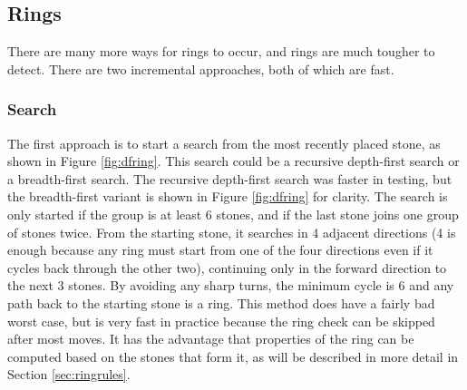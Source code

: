 \subsection{Rings}\label{sec:ringimpl}

There are many more ways for rings to occur, and rings are much tougher to detect. There are two incremental approaches, both of which are fast.

\subsubsection{Search}

The first approach is to start a search from the most recently placed stone, as shown in Figure \ref{fig:dfring}. This search could be a recursive depth-first search or a breadth-first search. The recursive depth-first search was faster in testing, but the breadth-first variant is shown in Figure \ref{fig:dfring} for clarity. The search is only started if the group is at least 6 stones, and if the last stone joins one group of stones twice. From the starting stone, it searches in 4 adjacent directions (4 is enough because any ring must start from one of the four directions even if it cycles back through the other two), continuing only in the forward direction to the next 3 stones. By avoiding any sharp turns, the minimum cycle is 6 and any path back to the starting stone is a ring. This method does have a fairly bad worst case, but is very fast in practice because the ring check can be skipped after most moves. It has the advantage that properties of the ring can be computed based on the stones that form it, as will be described in more detail in Section \ref{sec:ringrules}.

